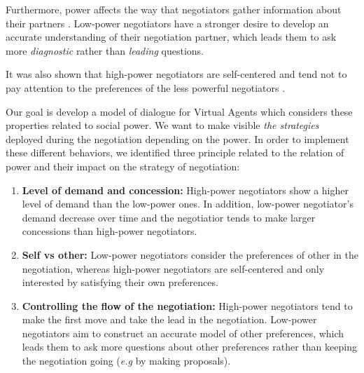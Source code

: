 \documentclass{llncs}
\begin{document}
		Furthermore, power affects the way that negotiators gather information about their partners \cite{de2004influence}. Low-power negotiators have a stronger desire to develop an accurate understanding of their negotiation partner, which leads them to ask more \emph{diagnostic} rather than \emph{leading} questions.
		
		It was also shown that high-power negotiators are self-centered and tend  not to pay attention to the preferences of the less powerful negotiators \cite{fiske1993controlling,de1995impact}.
		
		Our goal is develop a model of dialogue for Virtual Agents which considers these properties related to social power. We want to make visible \emph{the strategies} deployed during the negotiation depending on the power. In order to implement these different behaviors, we identified three principle related to the relation of power and their impact on the strategy of negotiation:
		\begin{enumerate}
			\item \textbf{Level of demand and concession:} High-power negotiators show a higher level of demand than the low-power ones. In addition, low-power negotiator's demand decrease over time and the negotiatior tends to make larger concessions than high-power negotiators. \cite{de1995impact}
			
			\item \textbf{Self vs other:} Low-power negotiators consider the preferences of other in the negotiation, whereas high-power negotiators are self-centered and only interested by satisfying their own preferences. \cite{fiske1993controlling,de1995impact}
			
			\item \textbf{Controlling the flow of the negotiation:}
			High-power negotiators tend to make the first move \cite{magee2007power} and take the lead in the negotiation. Low-power negotiators aim to construct an accurate model of other preferences, which leads them to ask more questions about other preferences rather than keeping the negotiation going (\emph{e.g} by making proposals)\cite{de2004influence}. 
			
		\end{enumerate}
		
\end{document}
